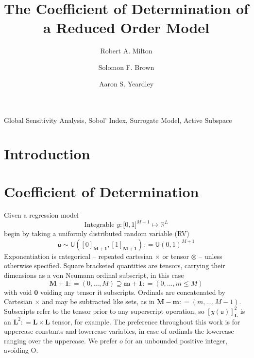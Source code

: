 \documentclass[preprint,12pt]{elsarticle}
\newcommand*{\M}[1]{\ensuremath{#1}\xspace}
\newcommand*{\x}{\times}
\newcommand*{\mi}[1]{\mathbf{#1}}
\newcommand*{\st}[1]{\mathbb{#1}}
\newcommand*{\rv}[1]{\mathsf{#1}}
\newcommand*{\te}[2][]{\left\lbrack{#2}\right\rbrack_{#1}}
\newcommand*{\deq}{\M{\mathrel{\mathop:}=}}
\newcommand{\T}[1]{\text{#1}}
\newcommand*{\uni}[2]{\mathsf{U}\!\left({#1,#2}\right)}
\newcommand*{\uniti}{\lbrack 0,1\rbrack}
\begin{document}
\begin{frontmatter}

    \title{The Coefficient of Determination of a Reduced Order Model}

    \author{Robert A. Milton}

    \author{Solomon F. Brown}

    \author{Aaron S. Yeardley}

    \address{Department of Chemical and Biological Engineering, University of Sheffield, Sheffield, S1 3JD, United Kingdom}       

    \begin{abstract}
    \end{abstract}

    \begin{keyword}
        Global Sensitivity Analysis, Sobol' Index, Surrogate Model, Active Subspace
    \end{keyword}

\end{frontmatter}

\section{Introduction}\label{sec:Intro}


\section{Coefficient of Determination}\label{sec:COD}
    Given a regression model
    \begin{equation*}
        \T{Integrable } y \colon \uniti^{M+1} \mapsto \st{R}^{L}
    \end{equation*}
    begin by taking a uniformly distributed random variable (RV)
    \begin{equation*}
        \rv{u} \sim \uni{\te[\mi{M+1}]{0}}{\te[\mi{M+1}]{1}} \deq \uni{0}{1}^{M+1}
    \end{equation*}
    Exponentiation is categorical -- repeated cartesian $\x$ or tensor $\otimes$ -- unless otherwise specified. Square bracketed quantities are tensors, carrying their dimensions as a von Neumann ordinal subscript, in this case
    \begin{equation*}
        \mi{M+1} \deq (0,\ldots,M) \supseteq \mi{m+1} \deq (0,\ldots,m \leq M)
    \end{equation*}
    with void $\mi{0}$ voiding any tensor it subscripts. Ordinals are concatenated by Cartesian $\times$ and may be subtracted like sets, as in $\mi{M-m} \deq (m,\ldots,M-1)$. 
    Subscripts refer to the tensor prior to any superscript operation, so $\te[\mi{L}]{y(\rv{u})}^{2}$ is an $\mi{L}^{2} \deq \mi{L\x L}$ tensor, for example.
    The preference throughout this work is for uppercase constants and lowercase variables, in case of ordinals the lowercase ranging over the uppercase. We prefer $o$ for an unbounded positive integer, avoiding O.
\end{document}
